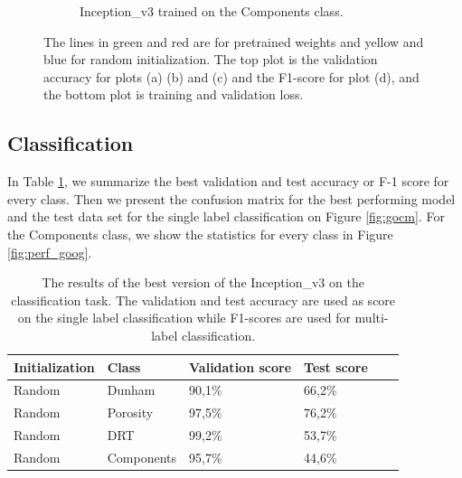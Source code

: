 \begin{figure}
{\begin{subfigure}[b]{.6\textwidth}
\label{fig:googinit_comp}
\caption{Inception\_v3 trained on the Components class.}
\end{subfigure}%
}
\caption[Training and validation plots for Inception\_v3]{The lines in green and red are for pretrained weights and yellow and blue for random initialization. The top plot is the validation accuracy for plots (a) (b) and (c) and the F1-score for plot (d), and the bottom plot is training  and validation loss.}
\label{fig:plotsgoogl}
\end{figure}


\subsection{Classification}
In Table \ref{tab:googbest}, we summarize the best validation and test accuracy or F-1 score for every class. Then we present the confusion matrix for the best performing model and the test data set for the single label classification on Figure \ref{fig:gocm}. For the Components class, we show the statistics for every class in Figure \ref{fig:perf_goog}. 

\begin{table}
\caption{\label{tab:googbest} The results of the best version of the Inception\_v3 on the classification task. The validation and test accuracy are used as score on the single label classification while F1-scores are used for multi-label classification.}
\centering
\begin{tabular}[b]{| l | l | l | l | l |}
\hline
    Initialization & Class & Validation score & Test score \ \\ \hline
    Random & Dunham &  90,1\%  & 66,2\% \\ \hline
    Random & Porosity &  97,5\%  & 76,2\% \\ \hline
    Random &DRT & 99,2\% & 53,7\% \\ \hline
    Random &Components & 95,7\% &  44,6\% \\ \hline
\end{tabular} 
\end{table}

